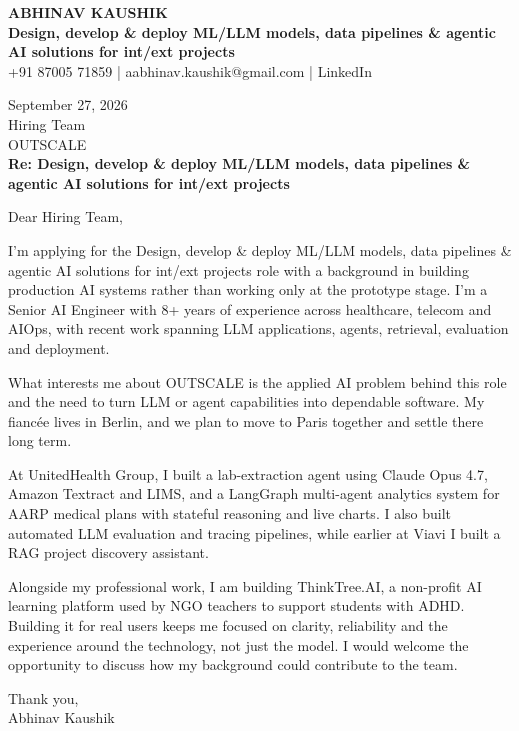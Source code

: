 \documentclass[10pt,a4paper]{article}
\begin{document}
\begin{center}
{\Large\bfseries ABHINAV KAUSHIK}\\[2pt]
{\bfseries Design, develop \& deploy ML/LLM models, data pipelines \& agentic AI solutions for int/ext projects}\\[2pt]
+91 87005 71859 \quad | \quad aabhinav.kaushik@gmail.com \quad | \quad LinkedIn
\end{center}
\vspace{8pt}
September 27, 2026\\[6pt]
Hiring Team\\
OUTSCALE\\[4pt]
\textbf{Re: Design, develop \& deploy ML/LLM models, data pipelines \& agentic AI solutions for int/ext projects}

Dear Hiring Team,

I’m applying for the Design, develop \& deploy ML/LLM models, data pipelines \& agentic AI solutions for int/ext projects role with a background in building production AI systems rather than working only at the prototype stage. I’m a Senior AI Engineer with 8+ years of experience across healthcare, telecom and AIOps, with recent work spanning LLM applications, agents, retrieval, evaluation and deployment.

What interests me about OUTSCALE is the applied AI problem behind this role and the need to turn LLM or agent capabilities into dependable software. My fiancée lives in Berlin, and we plan to move to Paris together and settle there long term.

At UnitedHealth Group, I built a lab-extraction agent using Claude Opus 4.7, Amazon Textract and LIMS, and a LangGraph multi-agent analytics system for AARP medical plans with stateful reasoning and live charts. I also built automated LLM evaluation and tracing pipelines, while earlier at Viavi I built a RAG project discovery assistant.

Alongside my professional work, I am building ThinkTree.AI, a non-profit AI learning platform used by NGO teachers to support students with ADHD. Building it for real users keeps me focused on clarity, reliability and the experience around the technology, not just the model. I would welcome the opportunity to discuss how my background could contribute to the team.

Thank you,\\
Abhinav Kaushik
\end{document}
